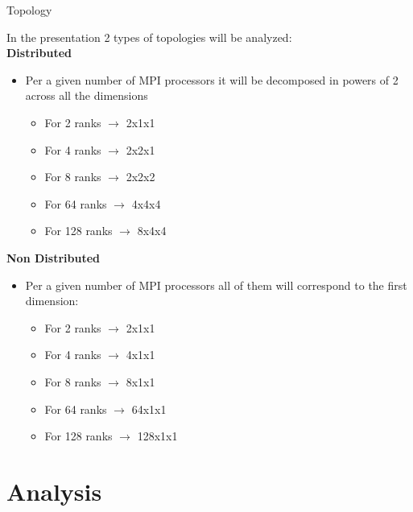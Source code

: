 \documentclass[aspectratio=169]{bredelebeamer}
\begin{document}
\begin{frame}{Topology}

In the presentation 2 types of topologies will be analyzed:\\
\vspace{0.5cm}
\textbf{Distributed}
\begin{itemize}
	\item Per a given number of MPI processors it will be decomposed in powers of 2 across all the dimensions
	\begin{itemize}
		\item For 2 ranks $\rightarrow$ 2x1x1
		\item For 4 ranks $\rightarrow$ 2x2x1
		\item For 8 ranks $\rightarrow$ 2x2x2
		\item For 64 ranks $\rightarrow$ 4x4x4
		\item For 128 ranks $\rightarrow$ 8x4x4
	\end{itemize}
\end{itemize}
\vspace{0.5cm}
\textbf{Non Distributed}
\begin{itemize}
	\item Per a given number of MPI processors all of them will correspond to the first dimension:
	\begin{itemize}
		\item For 2 ranks $\rightarrow$ 2x1x1
		\item For 4 ranks $\rightarrow$ 4x1x1
		\item For 8 ranks $\rightarrow$ 8x1x1
		\item For 64 ranks $\rightarrow$ 64x1x1
		\item For 128 ranks $\rightarrow$ 128x1x1
	\end{itemize}
\end{itemize}


\end{frame}


\section{Analysis}
\end{document}
